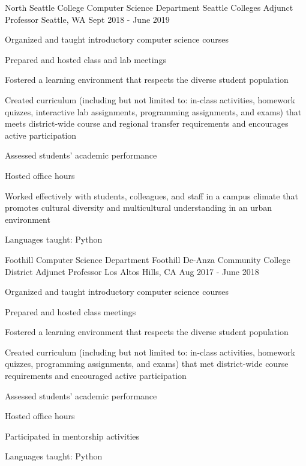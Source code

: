 \begin{cventries}
  \cventry
{North Seattle College Computer Science Department \newline Seattle Colleges}
    {Adjunct Professor}
    {Seattle, WA}
    {Sept 2018 - June 2019}
    {
      \begin{cvitems}
	\item {Organized and taught introductory computer science courses}\\
	\begin{cvitems}
         \item Prepared and hosted class and lab meetings
                  \item Fostered a learning environment that respects the diverse student population
                  \item Created curriculum (including but not limited to: in-class activities, homework quizzes, interactive lab assignments, programming assignments, and exams) that meets district-wide course and regional transfer requirements and encourages active participation
		\item Assessed students' academic performance
		\item Hosted office hours
	\end{cvitems}
	\vspace{2mm}
	\item Worked effectively with students, colleagues, and staff in a campus climate that promotes cultural diversity and multicultural understanding in an urban environment
	\item Languages taught: Python
      \end{cvitems}
    }

  \cventry
{Foothill Computer Science Department \newline Foothill De-Anza Community College District}
    {Adjunct Professor}
    {Los Altos Hills, CA}
    {Aug 2017 - June 2018}
    {
      \begin{cvitems}
	\item {Organized and taught introductory computer science courses}\\
	\begin{cvitems}
         \item Prepared and hosted class meetings
                  \item Fostered a learning environment that respects the diverse student population
		\item Created curriculum (including but not limited to: in-class activities, homework quizzes, programming assignments, and exams) that met district-wide course requirements and encouraged active participation
		\item Assessed students' academic performance
		\item Hosted office hours
	\end{cvitems}
	\vspace{2mm}
	\item Participated in mentorship activities
	\item Languages taught: Python
      \end{cvitems}
    }


\end{cventries}
